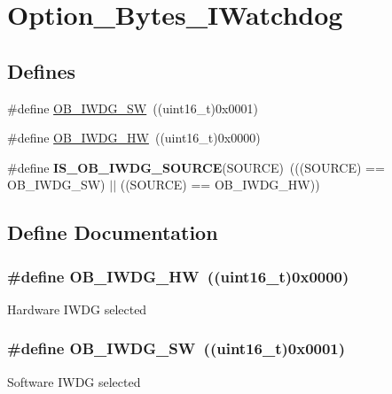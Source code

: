 \hypertarget{group__Option__Bytes__IWatchdog}{
\section{Option\_\-Bytes\_\-IWatchdog}
\label{group__Option__Bytes__IWatchdog}
}
\subsection*{Defines}
\begin{DoxyCompactItemize}
\item 
\#define \hyperlink{group__Option__Bytes__IWatchdog_ga5a357e232c955444c3f2ccb9a937ffce}{OB\_\-IWDG\_\-SW}~((uint16\_\-t)0x0001)
\item 
\#define \hyperlink{group__Option__Bytes__IWatchdog_gadfcbfa963d79c339ec8e2d5a7734e47a}{OB\_\-IWDG\_\-HW}~((uint16\_\-t)0x0000)
\item 
\hypertarget{group__Option__Bytes__IWatchdog_gaf2871652c08e76499d9449be6556f12c}{
\#define {\bfseries IS\_\-OB\_\-IWDG\_\-SOURCE}(SOURCE)~(((SOURCE) == OB\_\-IWDG\_\-SW) $|$$|$ ((SOURCE) == OB\_\-IWDG\_\-HW))}
\label{group__Option__Bytes__IWatchdog_gaf2871652c08e76499d9449be6556f12c}

\end{DoxyCompactItemize}


\subsection{Define Documentation}
\hypertarget{group__Option__Bytes__IWatchdog_gadfcbfa963d79c339ec8e2d5a7734e47a}{
\subsubsection[{OB\_\-IWDG\_\-HW}]{\setlength{\rightskip}{0pt plus 5cm}\#define OB\_\-IWDG\_\-HW~((uint16\_\-t)0x0000)}}
\label{group__Option__Bytes__IWatchdog_gadfcbfa963d79c339ec8e2d5a7734e47a}
Hardware IWDG selected \hypertarget{group__Option__Bytes__IWatchdog_ga5a357e232c955444c3f2ccb9a937ffce}{
\subsubsection[{OB\_\-IWDG\_\-SW}]{\setlength{\rightskip}{0pt plus 5cm}\#define OB\_\-IWDG\_\-SW~((uint16\_\-t)0x0001)}}
\label{group__Option__Bytes__IWatchdog_ga5a357e232c955444c3f2ccb9a937ffce}
Software IWDG selected 
